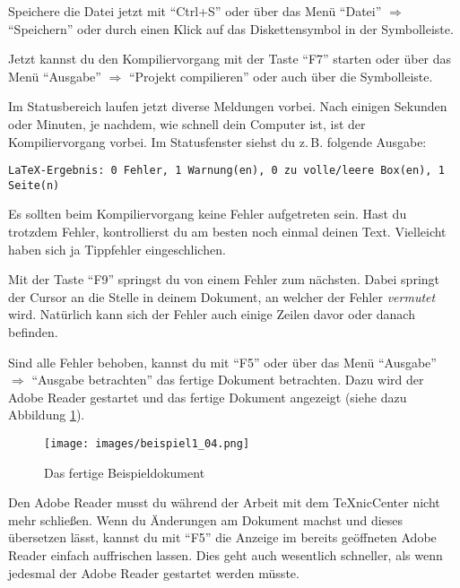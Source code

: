 Speichere die Datei jetzt mit \enquote{Ctrl+S} oder über das Menü \enquote{Datei} $\Rightarrow$ \enquote{Speichern} oder durch einen Klick auf das Diskettensymbol in der Symbolleiste.

Jetzt kannst du den Kompiliervorgang mit der Taste \enquote{F7} starten oder über das Menü \enquote{Ausgabe} $\Rightarrow$ \enquote{Projekt compilieren} oder auch über die Symbolleiste.

Im Statusbereich laufen jetzt diverse Meldungen vorbei. Nach einigen Sekunden oder Minuten, je nachdem, wie schnell dein Computer ist, ist der Kompiliervorgang vorbei. Im Statusfenster siehst du z.\,B. folgende Ausgabe:

\begin{lstlisting}
LaTeX-Ergebnis: 0 Fehler, 1 Warnung(en), 0 zu volle/leere Box(en), 1 Seite(n)
\end{lstlisting}

Es sollten beim Kompiliervorgang keine Fehler aufgetreten sein. Hast du trotzdem Fehler, kontrollierst du am besten noch einmal deinen Text. Vielleicht haben sich ja Tippfehler eingeschlichen.

Mit der Taste \enquote{F9} springst du von einem Fehler zum nächsten. Dabei springt der Cursor an die Stelle in deinem Dokument, an welcher der Fehler \emph{vermutet} wird. Natürlich kann sich der Fehler auch einige Zeilen davor oder danach befinden.

Sind alle Fehler behoben, kannst du mit \enquote{F5} oder über das Menü \enquote{Ausgabe} $\Rightarrow$ \enquote{Ausgabe betrachten} das fertige Dokument betrachten. Dazu wird der Adobe Reader gestartet und das fertige Dokument angezeigt (siehe dazu Abbildung \ref{fig:beispiel1_04}).

\begin{figure}[ht]
	\begin{center}
		\texttt{[image: images/beispiel1\_04.png]}
	\end{center}
	\caption{Das fertige Beispieldokument}
	\label{fig:beispiel1_04}
\end{figure}

Den Adobe Reader musst du während der Arbeit mit dem TeXnicCenter nicht mehr schließen. Wenn du Änderungen am Dokument machst und dieses übersetzen lässt, kannst du mit \enquote{F5} die Anzeige im bereits geöffneten Adobe Reader einfach auffrischen lassen. Dies geht auch wesentlich schneller, als wenn jedesmal der Adobe Reader gestartet werden müsste.

